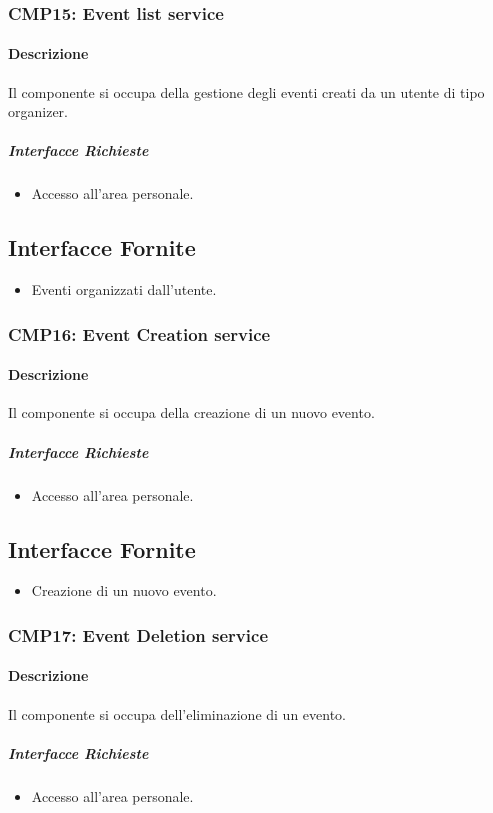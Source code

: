 \documentclass[9pt]{extarticle}
\begin{document}
\subsubsection*{CMP15: Event list service}
\paragraph{Descrizione}
Il componente si occupa della gestione degli eventi creati da un utente di tipo organizer.
\subparagraph{Interfacce Richieste}
\begin{itemize}
	\item Accesso all'area personale.
\end{itemize}
\subsection{Interfacce Fornite}
\begin{itemize}
	\item Eventi organizzati dall'utente.
\end{itemize}

\subsubsection*{CMP16: Event Creation service}
\paragraph{Descrizione}
Il componente si occupa della creazione di un nuovo evento.
\subparagraph{Interfacce Richieste}
\begin{itemize}
	\item Accesso all'area personale.
\end{itemize}
\subsection{Interfacce Fornite}
\begin{itemize}
	\item Creazione di un nuovo evento.
\end{itemize}

\subsubsection*{CMP17: Event Deletion service}
\paragraph{Descrizione}
Il componente si occupa dell'eliminazione di un evento.
\subparagraph{Interfacce Richieste}
\begin{itemize}
	\item Accesso all'area personale.
\end{itemize}
\end{document}
